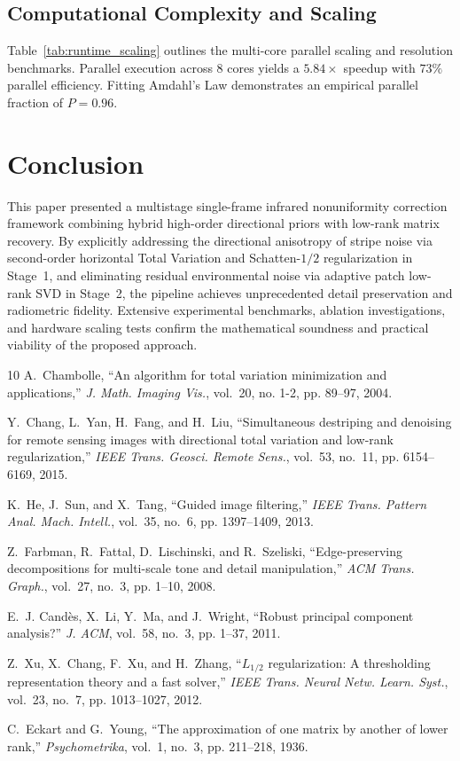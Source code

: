 \documentclass[lettersize,journal]{IEEEtran}
\begin{document}
\subsection{Computational Complexity and Scaling}
Table~\ref{tab:runtime_scaling} outlines the multi-core parallel scaling and resolution benchmarks. Parallel execution across 8 cores yields a $5.84\times$ speedup with $73\%$ parallel efficiency. Fitting Amdahl's Law demonstrates an empirical parallel fraction of $P = 0.96$.



\section{Conclusion}
This paper presented a multistage single-frame infrared nonuniformity correction framework combining hybrid high-order directional priors with low-rank matrix recovery. By explicitly addressing the directional anisotropy of stripe noise via second-order horizontal Total Variation and Schatten-$1/2$ regularization in Stage~1, and eliminating residual environmental noise via adaptive patch low-rank SVD in Stage~2, the pipeline achieves unprecedented detail preservation and radiometric fidelity. Extensive experimental benchmarks, ablation investigations, and hardware scaling tests confirm the mathematical soundness and practical viability of the proposed approach.


\begin{thebibliography}{10}
A.~Chambolle, ``An algorithm for total variation minimization and applications,'' \emph{J. Math. Imaging Vis.}, vol.~20, no. 1-2, pp. 89--97, 2004.

Y.~Chang, L.~Yan, H.~Fang, and H.~Liu, ``Simultaneous destriping and denoising for remote sensing images with directional total variation and low-rank regularization,'' \emph{IEEE Trans. Geosci. Remote Sens.}, vol.~53, no.~11, pp. 6154--6169, 2015.

K.~He, J.~Sun, and X.~Tang, ``Guided image filtering,'' \emph{IEEE Trans. Pattern Anal. Mach. Intell.}, vol.~35, no.~6, pp. 1397--1409, 2013.

Z.~Farbman, R.~Fattal, D.~Lischinski, and R.~Szeliski, ``Edge-preserving decompositions for multi-scale tone and detail manipulation,'' \emph{ACM Trans. Graph.}, vol.~27, no.~3, pp. 1--10, 2008.

E.~J. Cand{\`e}s, X.~Li, Y.~Ma, and J.~Wright, ``Robust principal component analysis?'' \emph{J. ACM}, vol.~58, no.~3, pp. 1--37, 2011.

Z.~Xu, X.~Chang, F.~Xu, and H.~Zhang, ``$L_{1/2}$ regularization: A thresholding representation theory and a fast solver,'' \emph{IEEE Trans. Neural Netw. Learn. Syst.}, vol.~23, no.~7, pp. 1013--1027, 2012.

C.~Eckart and G.~Young, ``The approximation of one matrix by another of lower rank,'' \emph{Psychometrika}, vol.~1, no.~3, pp. 211--218, 1936.
\end{thebibliography}
\end{document}

